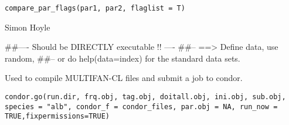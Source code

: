 \documentclass[a4paper]{book}
\begin{document}
%
\begin{Usage}
\begin{verbatim}
compare_par_flags(par1, par2, flaglist = T)
\end{verbatim}
\end{Usage}
%
\begin{Arguments}
\begin{ldescription}
\item[\code{par1}] 


\item[\code{par2}] 


\item[\code{flaglist}] 


\end{ldescription}
\end{Arguments}
%
\begin{Author}\relax

Simon Hoyle
\end{Author}
%
\begin{Examples}
\begin{ExampleCode}
##---- Should be DIRECTLY executable !! ----
##-- ==>  Define data, use random,
##--	or do  help(data=index)  for the standard data sets.

\end{ExampleCode}
\end{Examples}
%
\begin{Description}\relax

Used to compile MULTIFAN-CL files and submit a job to condor. 
\end{Description}
%
\begin{Usage}
\begin{verbatim}
condor.go(run.dir, frq.obj, tag.obj, doitall.obj, ini.obj, sub.obj, species = "alb", condor_f = condor_files, par.obj = NA, run_now = TRUE,fixpermissions=TRUE)
\end{verbatim}
\end{Usage}
%
\end{document}

